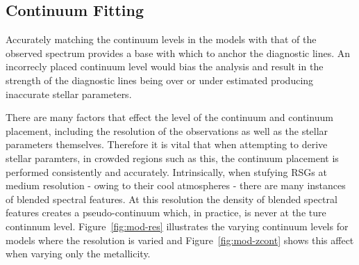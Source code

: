 \documentclass[12pt]{article}
\begin{document}
\subsection{Continuum Fitting} %
\label{sub:continuum_fitting}

Accurately matching the continuum levels in the models with that of the observed
spectrum provides a base with which to anchor the diagnostic lines.
An incorrecly placed continuum level would bias the analysis and result in the
strength of the diagnostic lines being over or under estimated producing inaccurate stellar parameters.

There are many factors that effect the level of the continuum and continuum placement,
including the resolution of the observations as well as the stellar parameters themselves.
Therefore it is vital that when attempting to derive stellar paramters,
in crowded regions such as this, the continuum placement is performed
consistently and accurately.
Intrinsically, when stufying RSGs at medium resolution - owing  to their cool atmospheres -
there are many instances of blended spectral features.
At this resolution the density of blended spectral features creates a pseudo-continuum which, in practice,
is never at the ture continnum level.
Figure~\ref{fig:mod-res} illustrates the varying continuum levels for models where the resolution is varied and
Figure~\ref{fig:mod-zcont} shows this affect when varying only the metallicity.
\end{document}
